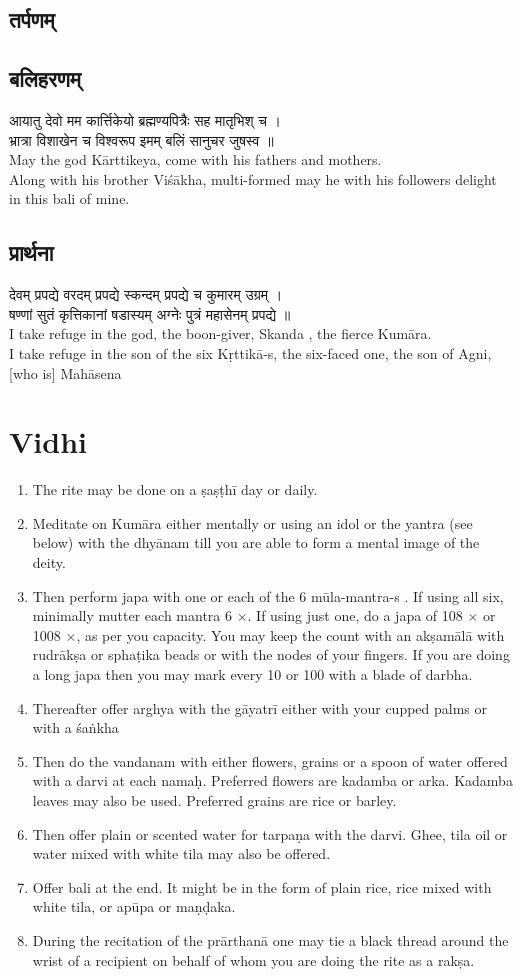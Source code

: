 \documentclass[12pt]{article}
\begin{document}
\subsection{{\skt तर्पणम् }}
\subsection{{\skt बलिहरणम् }}
{\large {\skt आयातु देवो मम कार्त्तिकेयो ब्रह्मण्यपित्रैः सह मातृभिश् च ।\\
भ्रात्रा विशाखेन च विश्वरूप इमम् बलिं सानुचर जुषस्व ॥ }}\\[8pt]
May the god Kārttikeya, come with his fathers and mothers.\\
Along with his brother Viśākha, multi-formed may he with his followers delight in this bali of mine.
\subsection{{\skt प्रार्थना }}
{\large {\skt  देवम् प्रपद्ये वरदम् प्रपद्ये स्कन्दम् प्रपद्ये च कुमारम् उग्रम् ।\\
षण्णां सुतं कृत्तिकानां षडास्यम् अग्नेः पुत्रं महासेनम् प्रपद्ये ॥}}\\[8pt]
I take refuge in the god, the boon-giver, Skanda , the fierce Kumāra.\\
I take refuge in the son of the six Kṛttikā-s, the six-faced one, the son of Agni, [who is] Mahāsena
\section{Vidhi}
\begin{enumerate}
\item The rite may be done on a ṣaṣṭhī day or daily.
\item Meditate on Kumāra either mentally or using an idol or the yantra (see below) with the dhyānam till you are able to form a mental image of the deity.
\item  Then perform japa with one or each of the 6 mūla-mantra-s . If using all six, minimally mutter each mantra 6 $\times$. If using just one, do a japa of 108 $\times$ or 1008 $\times$, as per you capacity. You may keep the count with an akṣamālā with rudrākṣa or sphaṭika beads or with the nodes of your fingers. If you are doing a long japa then you may mark every 10 or 100 with a blade of darbha.
\item  Thereafter offer arghya with the gāyatrī either with your cupped palms or with a śaṅkha
\item Then do the vandanam with either flowers, grains or a spoon of water offered with a darvi at each namaḥ. Preferred flowers are kadamba or arka. Kadamba leaves may also be used. Preferred grains are rice or barley.
\item Then offer plain or scented water for tarpaṇa with the darvi. Ghee, tila oil or water mixed with white tila may also be offered.
\item Offer bali at the end. It might be in the form of plain rice, rice mixed with white tila, or  apūpa or maṇḍaka.
\item During the recitation of the prārthanā one may tie a black thread around the wrist of a recipient on behalf of whom you are doing the rite as a rakṣa.
\end{enumerate} 
\end{document}
